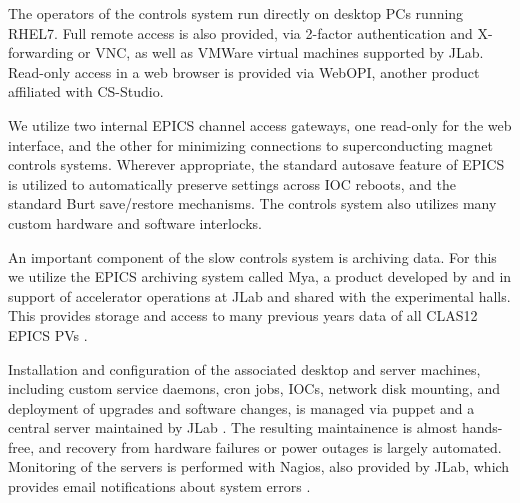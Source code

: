 The operators of the controls system run directly on desktop PCs running RHEL7.  Full remote access is also provided, via 2-factor authentication and X-forwarding or VNC, as well as VMWare virtual machines supported by JLab.  Read-only access in a web browser is provided via WebOPI, another product affiliated with CS-Studio.

We utilize two internal EPICS channel access gateways, one read-only for the web interface, and the other for minimizing connections to superconducting magnet controls systems.  Wherever appropriate, the standard autosave feature of EPICS is utilized to automatically preserve settings across IOC reboots, and the standard Burt save/restore mechanisms.  The controls system also utilizes many custom hardware and software interlocks.

An important component of the slow controls system is archiving data.  For this we utilize the EPICS archiving system called Mya, a product developed by and in support of accelerator operations at JLab and shared with the experimental halls.  This provides storage and access to many previous years data of all CLAS12 EPICS PVs \cite{mya}.

Installation and configuration of the associated desktop and server machines, including custom service daemons, cron jobs, IOCs, network disk mounting, and deployment of upgrades and software changes, is managed via puppet and a central server maintained by JLab \cite{puppet-website}. The resulting maintainence is almost hands-free, and recovery from hardware failures or power outages is largely automated.  Monitoring of the servers is performed with Nagios, also provided by JLab, which provides email notifications about system errors \cite{nagios-website}.


